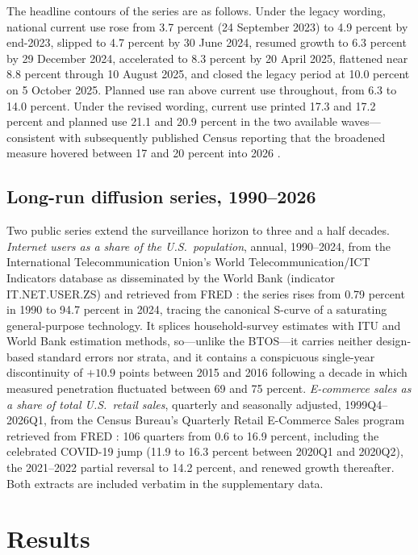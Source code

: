 \documentclass[review,authoryear,12pt]{elsarticle}
\begin{document}
The headline contours of the series are as follows. Under the legacy wording, national current use rose from 3.7 percent (24 September 2023) to 4.9 percent by end-2023, slipped to 4.7 percent by 30 June 2024, resumed growth to 6.3 percent by 29 December 2024, accelerated to 8.3 percent by 20 April 2025, flattened near 8.8 percent through 10 August 2025, and closed the legacy period at 10.0 percent on 5 October 2025. Planned use ran above current use throughout, from 6.3 to 14.0 percent. Under the revised wording, current use printed 17.3 and 17.2 percent and planned use 21.1 and 20.9 percent in the two available waves---consistent with subsequently published Census reporting that the broadened measure hovered between 17 and 20 percent into 2026 \citep{censusstory2026}.

\subsection{Long-run diffusion series, 1990--2026}
\label{sec:longdata}

Two public series extend the surveillance horizon to three and a half decades. \emph{Internet users as a share of the U.S.\ population}, annual, 1990--2024, from the International Telecommunication Union's World Telecommunication/ICT Indicators database as disseminated by the World Bank (indicator IT.NET.USER.ZS) and retrieved from FRED \citep{fredinternet}: the series rises from 0.79 percent in 1990 to 94.7 percent in 2024, tracing the canonical S-curve of a saturating general-purpose technology. It splices household-survey estimates with ITU and World Bank estimation methods, so---unlike the BTOS---it carries neither design-based standard errors nor strata, and it contains a conspicuous single-year discontinuity of $+10.9$ points between 2015 and 2016 following a decade in which measured penetration fluctuated between 69 and 75 percent. \emph{E-commerce sales as a share of total U.S.\ retail sales}, quarterly and seasonally adjusted, 1999Q4--2026Q1, from the Census Bureau's Quarterly Retail E-Commerce Sales program retrieved from FRED \citep{fredecom}: 106 quarters from 0.6 to 16.9 percent, including the celebrated COVID-19 jump (11.9 to 16.3 percent between 2020Q1 and 2020Q2), the 2021--2022 partial reversal to 14.2 percent, and renewed growth thereafter. Both extracts are included verbatim in the supplementary data.

\section{Results}
\label{sec:results}
\end{document}
